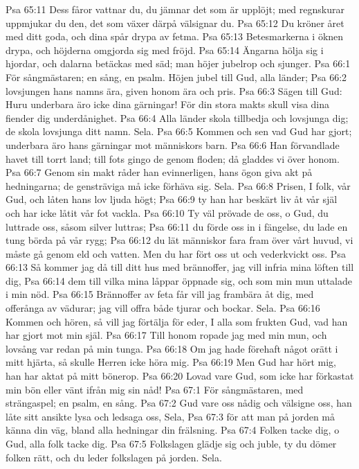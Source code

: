 Psa 65:11  Dess fåror vattnar du, du jämnar det som är upplöjt; med regnskurar uppmjukar du den, det som växer därpå välsignar du.
Psa 65:12  Du kröner året med ditt goda, och dina spår drypa av fetma.
Psa 65:13  Betesmarkerna i öknen drypa, och höjderna omgjorda sig med fröjd.
Psa 65:14  Ängarna hölja sig i hjordar, och dalarna betäckas med säd; man höjer jubelrop och sjunger.
Psa 66:1  För sångmästaren; en sång, en psalm. Höjen jubel till Gud, alla länder;
Psa 66:2  lovsjungen hans namns ära, given honom ära och pris.
Psa 66:3  Sägen till Gud: Huru underbara äro icke dina gärningar! För din stora makts skull visa dina fiender dig underdånighet.
Psa 66:4  Alla länder skola tillbedja och lovsjunga dig; de skola lovsjunga ditt namn. Sela.
Psa 66:5  Kommen och sen vad Gud har gjort; underbara äro hans gärningar mot människors barn.
Psa 66:6  Han förvandlade havet till torrt land; till fots gingo de genom floden; då gladdes vi över honom.
Psa 66:7  Genom sin makt råder han evinnerligen, hans ögon giva akt på hedningarna; de gensträviga må icke förhäva sig. Sela.
Psa 66:8  Prisen, I folk, vår Gud, och låten hans lov ljuda högt;
Psa 66:9  ty han har beskärt liv åt vår själ och har icke låtit vår fot vackla.
Psa 66:10  Ty väl prövade de oss, o Gud, du luttrade oss, såsom silver luttras;
Psa 66:11  du förde oss in i fängelse, du lade en tung börda på vår rygg;
Psa 66:12  du lät människor fara fram över vårt huvud, vi måste gå genom eld och vatten. Men du har fört oss ut och vederkvickt oss.
Psa 66:13  Så kommer jag då till ditt hus med brännoffer, jag vill infria mina löften till dig,
Psa 66:14  dem till vilka mina låppar öppnade sig, och som min mun uttalade i min nöd.
Psa 66:15  Brännoffer av feta får vill jag frambära åt dig, med offerånga av vädurar; jag vill offra både tjurar och bockar. Sela.
Psa 66:16  Kommen och hören, så vill jag förtälja för eder, I alla som frukten Gud, vad han har gjort mot min själ.
Psa 66:17  Till honom ropade jag med min mun, och lovsång var redan på min tunga.
Psa 66:18  Om jag hade förehaft något orätt i mitt hjärta, så skulle Herren icke höra mig.
Psa 66:19  Men Gud har hört mig, han har aktat på mitt bönerop.
Psa 66:20  Lovad vare Gud, som icke har förkastat min bön eller vänt ifrån mig sin nåd!
Psa 67:1  För sångmästaren, med strängaspel; en psalm, en sång.
Psa 67:2  Gud vare oss nådig och välsigne oss, han låte sitt ansikte lysa och ledsaga oss, Sela,
Psa 67:3  för att man på jorden må känna din väg, bland alla hedningar din frälsning.
Psa 67:4  Folken tacke dig, o Gud, alla folk tacke dig.
Psa 67:5  Folkslagen glädje sig och juble, ty du dömer folken rätt, och du leder folkslagen på jorden. Sela.
